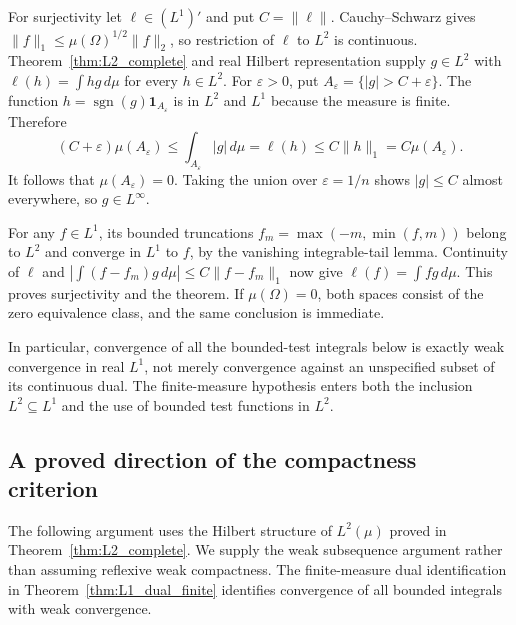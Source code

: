 For surjectivity let $\ell\in(L^1)'$ and put $C=\|\ell\|$.
Cauchy--Schwarz gives
$\|f\|_1\leq\mu(\Omega)^{1/2}\|f\|_2$, so restriction of $\ell$
to $L^2$ is continuous. Theorem~\ref{thm:L2_complete} and real Hilbert
representation supply $g\in L^2$ with
$\ell(h)=\int hg\,d\mu$ for every $h\in L^2$.
For $\varepsilon>0$, put $A_\varepsilon=\{|g|>C+\varepsilon\}$.
The function $h=\operatorname{sgn}(g)\mathbf1_{A_\varepsilon}$ is in
$L^2$ and $L^1$ because the measure is finite. Therefore
\[
(C+\varepsilon)\mu(A_\varepsilon)
\leq\int_{A_\varepsilon}|g|\,d\mu
=\ell(h)\leq C\|h\|_1=C\mu(A_\varepsilon).
\]
It follows that $\mu(A_\varepsilon)=0$. Taking the union over
$\varepsilon=1/n$ shows $|g|\leq C$ almost everywhere, so
$g\in L^\infty$.

For any $f\in L^1$, its bounded truncations
$f_m=\max(-m,\min(f,m))$ belong to $L^2$ and converge in $L^1$ to $f$,
by the vanishing integrable-tail lemma. Continuity of $\ell$ and
$|\int(f-f_m)g\,d\mu|\leq C\|f-f_m\|_1$ now give
$\ell(f)=\int fg\,d\mu$. This proves surjectivity and the theorem.
If $\mu(\Omega)=0$, both spaces consist of the zero equivalence class,
and the same conclusion is immediate.
\Done

In particular, convergence of all the bounded-test integrals below is
exactly weak convergence in real $L^1$, not merely convergence against
an unspecified subset of its continuous dual. The finite-measure
hypothesis enters both the inclusion $L^2\subseteq L^1$ and the use
of bounded test functions in $L^2$.

\subsection{A proved direction of the compactness criterion}
The following argument uses the Hilbert structure of $L^2(\mu)$ proved
in Theorem~\ref{thm:L2_complete}.
We supply the weak subsequence argument rather than assuming reflexive
weak compactness. The finite-measure dual identification in
Theorem~\ref{thm:L1_dual_finite} identifies convergence of all bounded
integrals with weak convergence.

